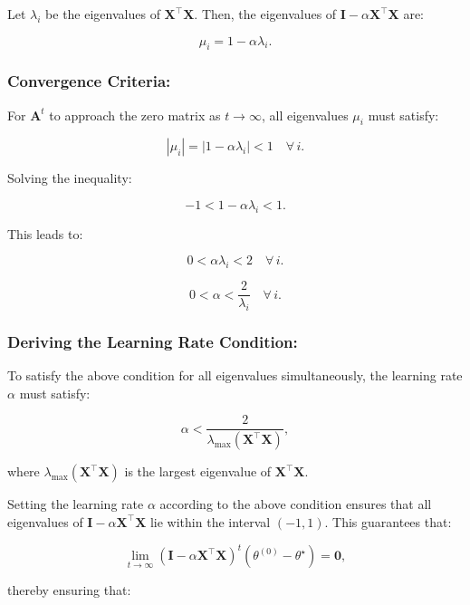 Let \(\lambda_i\) be the eigenvalues of \(\boldsymbol{X}^\top \boldsymbol{X}\). Then, the eigenvalues of \(\mathbf{I} - \alpha \boldsymbol{X}^\top \boldsymbol{X}\) are:

\[
    \mu_i = 1 - \alpha \lambda_i.
\]

\subsubsection{Convergence Criteria:}

For \(\mathbf{A}^t\) to approach the zero matrix as \(t \to \infty\), all eigenvalues \(\mu_i\) must satisfy:

\[
    |\mu_i| = |1 - \alpha \lambda_i| < 1 \quad \forall \, i.
\]

Solving the inequality:

\[
    -1 < 1 - \alpha \lambda_i < 1.
\]

This leads to:

\[
    0 < \alpha \lambda_i < 2 \quad \forall \, i.
\]

\[
    0 < \alpha < \frac{2}{\lambda_i} \quad \forall \, i.
\]

\subsubsection{Deriving the Learning Rate Condition:}

To satisfy the above condition for all eigenvalues simultaneously, the learning rate \(\alpha\) must satisfy:

\[
    \alpha < \frac{2}{\lambda_{\max}(\boldsymbol{X}^\top \boldsymbol{X})},
\]

where \(\lambda_{\max}(\boldsymbol{X}^\top \boldsymbol{X})\) is the largest eigenvalue of \(\boldsymbol{X}^\top \boldsymbol{X}\).


Setting the learning rate \(\alpha\) according to the above condition ensures that all eigenvalues of \(\mathbf{I} - \alpha \boldsymbol{X}^\top \boldsymbol{X}\) lie within the interval \((-1, 1)\). This guarantees that:

\[
    \lim_{t \to \infty} (\mathbf{I} - \alpha \boldsymbol{X}^\top \boldsymbol{X})^t (\theta^{(0)} - \theta^\star) = \mathbf{0},
\]

thereby ensuring that:

